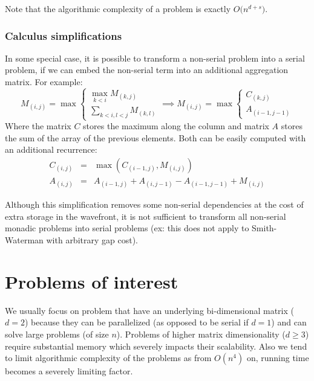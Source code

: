 Note that the algorithmic complexity of a problem is exactly $O\big(n^{d+s}\big)$.

\subsubsection{Calculus simplifications}
In some special case, it is possible to transform a non-serial problem into a serial problem, if we can embed the non-serial term into an additional aggregation matrix. For example:
	\[M_{(i,j)}=\max\left\{\begin{array}{l} \max\limits_{k<i} M_{(k,j)}
	\\ \sum\limits_{k<i, l<j}M_{(k,l)} \end{array}\right.
	\implies M_{(i,j)}=\max\left\{\begin{array}{l} C_{(k,j)} \\ A_{(i-1,j-1)} \end{array}\right.\]
Where the matrix $C$ stores the maximum along the column and matrix $A$ stores the sum of the array of the previous elements. Both can be easily computed with an additional recurrence:
	\[\begin{array}{rcl} C_{(i,j)}&=&\max(C_{(i-1,j)}, M_{(i,j)}) \\
	A_{(i,j)}&=&A_{(i-1,j)}+A_{(i,j-1)}-A_{(i-1,j-1)}+M_{(i,j)}\end{array}\]

Although this simplification removes some non-serial dependencies at the cost of extra storage in the wavefront, it is not sufficient to transform all non-serial monadic problems into serial problems (ex: this does not apply to Smith-Waterman with arbitrary gap cost).

\section{Problems of interest}
We usually focus on problem that have an underlying bi-dimensional matrix ($d=2$) because they can be parallelized (as opposed to be serial if $d=1$) and can solve large problems (of size $n$). Problems of higher matrix dimensionality ($d\ge3$) require substantial memory which severely impacts their scalability. Also we tend to limit algorithmic complexity of the problems as from $O(n^4)$ on, running time becomes a severely limiting factor.

